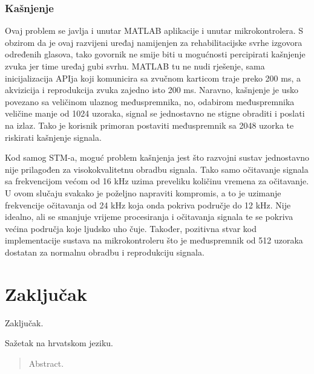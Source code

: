 \documentclass[times, utf8, diplomski]{fer}
\begin{document}
\subsection{Kašnjenje}
Ovaj problem se javlja i unutar MATLAB aplikacije i unutar mikrokontrolera. S obzirom da je ovaj razvijeni uređaj namijenjen za rehabilitacijske svrhe izgovora određenih glasova, tako govornik ne smije biti u mogućnosti percipirati kašnjenje zvuka jer time uređaj gubi svrhu. MATLAB tu ne nudi rješenje, sama inicijalizacija APIja koji komunicira sa zvučnom karticom traje preko 200 ms, a akvizicija i reprodukcija zvuka zajedno isto 200 ms. Naravno, kašnjenje je usko povezano sa veličinom ulaznog međuspremnika, no, odabirom međuspremnika veličine manje od 1024 uzoraka, signal se jednostavno ne stigne obraditi i poslati na izlaz. Tako je korisnik primoran postaviti međuspremnik sa 2048 uzorka te riskirati kašnjenje signala.

Kod samog STM-a, moguć problem kašnjenja jest što razvojni sustav jednostavno nije prilagođen za visokokvalitetnu obradbu signala. Tako samo očitavanje signala sa frekvencijom većom od 16 kHz uzima preveliku količinu vremena za očitavanje. U ovom slučaju svakako je poželjno napraviti kompromis, a to je uzimanje frekvencije očitavanja od 24 kHz koja onda pokriva područje do 12 kHz. Nije idealno, ali se smanjuje vrijeme procesiranja i očitavanja signala te se pokriva većina područja koje ljudsko uho čuje. Također, pozitivna stvar kod implementacije sustava na mikrokontroleru što je međuspremnik od 512 uzoraka dostatan za normalnu obradbu i reprodukciju signala.
\chapter{Zaključak}
Zaključak.




\begin{sazetak}
Sažetak na hrvatskom jeziku.

\end{sazetak}

\begin{abstract}
Abstract.

\end{abstract}
\end{document}
